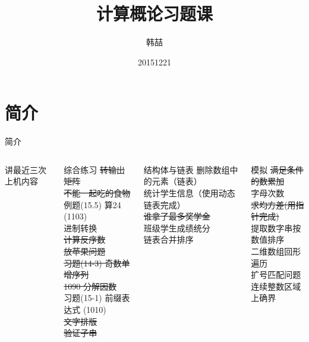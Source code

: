 \documentclass[color=usenames,dvipsnames]{beamer}
\title[COE2015上机题]{计算概论习题课}
\author{韩喆}
\institute{WIP@ICST}
\date{20151221}
\begin{document}
\begin{frame}
  \titlepage
\end{frame}


\section{简介}

\begin{frame}{简介}\footnotesize

\begin{columns}
 \column{0.45\hsize}
讲最近三次上机内容
\vspace{0.5cm}

 \begin{block}{综合练习}
\sout{转输出矩阵} \\ 
\sout{不能一起吃的食物} \\ 
例题(15.5) 算24 (1103) \\ 
进制转换 \\ 
\sout{计算反序数} \\ 
\sout{放苹果问题} \\ 
\sout{习题(14-3) 奇数单增序列} \\ 
\sout{1090 分解因数} \\ 
习题(15-1) 前缀表达式 (1010) \\ 
\sout{文字排版} \\ 
\sout{验证子串 }
 \end{block}
 

 \column{0.45\hsize}
 \begin{block}{结构体与链表}
 删除数组中的元素（链表）\\ 
统计学生信息（使用动态链表完成）\\ 
\sout{谁拿了最多奖学金}\\ 
班级学生成绩统分\\ 
链表合并排序
 \end{block}
 \begin{block}{模拟}
 \sout{满足条件的数累加}\\ 
字母次数\\ 
\sout{求均方差(用指针完成)}\\ 
提取数字串按数值排序\\ 
二维数组回形遍历\\ 
扩号匹配问题\\ 
连续整数区域上确界
 \end{block} 
\end{columns}

\end{frame}
\end{document}

